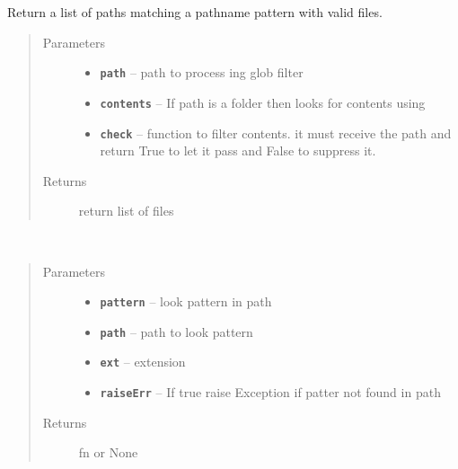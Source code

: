 \documentclass[letterpaper,10pt,english]{sphinxmanual}
\begin{document}
\begin{fulllineitems}
\label{RRtoolbox.lib:RRtoolbox.lib.root.glob}
Return a list of paths matching a pathname pattern with valid files.
\begin{quote}\begin{description}
\item[{Parameters}] \leavevmode\begin{itemize}
\item {} 
\textbf{\texttt{path}} -- path to process ing glob filter

\item {} 
\textbf{\texttt{contents}} -- If path is a folder then looks for contents using

\item {} 
\textbf{\texttt{check}} -- function to filter contents. it must receive the path
and return True to let it pass and False to suppress it.

\end{itemize}

\item[{Returns}] \leavevmode
return list of files

\end{description}\end{quote}

\end{fulllineitems}


\begin{fulllineitems}
\label{RRtoolbox.lib:RRtoolbox.lib.root.lookinglob}~\begin{quote}\begin{description}
\item[{Parameters}] \leavevmode\begin{itemize}
\item {} 
\textbf{\texttt{pattern}} -- look pattern in path

\item {} 
\textbf{\texttt{path}} -- path to look pattern

\item {} 
\textbf{\texttt{ext}} -- extension

\item {} 
\textbf{\texttt{raiseErr}} -- If true raise Exception if patter not found in path

\end{itemize}

\item[{Returns}] \leavevmode
fn or None

\end{description}\end{quote}

\end{fulllineitems}
\end{document}
